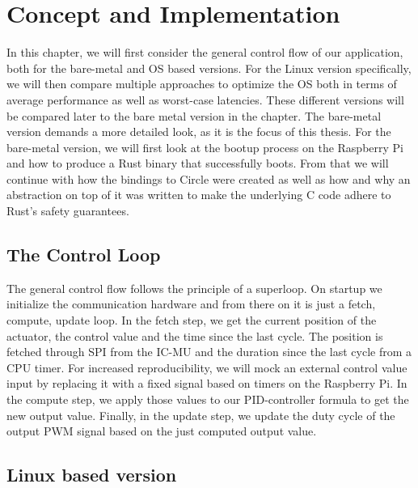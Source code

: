 
\chapter{Concept and Implementation}
\label{chap:concept_and_implementation}

In this chapter, we will first consider the general control flow of our application, both for the bare-metal and OS based versions.
For the Linux version specifically, we will then compare multiple approaches to optimize the OS both in terms of average performance as well as worst-case latencies.
These different versions will be compared later to the bare metal version in the  chapter.
The bare-metal version demands a more detailed look, as it is the focus of this thesis.
For the bare-metal version, we will first look at the bootup process on the Raspberry Pi and how to produce a Rust binary that successfully boots.
From that we will continue with how the bindings to Circle were created as well as how and why an abstraction on top of it was written to make the underlying C code adhere to Rust's safety guarantees.

\section{The Control Loop}
\label{sec:concept_and_implementation:control_flow}

The general control flow follows the principle of a superloop.
On startup we initialize the communication hardware and from there on it is just a fetch, compute, update loop.
In the fetch step, we get the current position of the actuator, the control value and the time since the last cycle.
The position is fetched through SPI from the IC-MU and the duration since the last cycle from a CPU timer.
For increased reproducibility, we will mock an external control value input by replacing it with a fixed signal based on timers on the Raspberry Pi.
In the compute step, we apply those values to our PID-controller formula to get the new output value.
Finally, in the update step, we update the duty cycle of the output PWM signal based on the just computed output value.

\section{Linux based version}
\label{sec:concept_and_implementation:linux}

